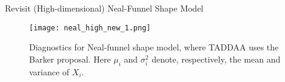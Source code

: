 \documentclass[10pt,xcolor=table]{beamer}
\begin{document}
%


\begin{frame}{Revisit (High-dimensional) Neal-Funnel Shape Model}
\begin{figure}[t]
    \texttt{[image: neal\_high\_new\_1.png]}
    \caption{Diagnostics for Neal-funnel shape model, where 
        TADDAA uses the Barker proposal. 
        Here $\mu_{i}$ and $\sigma_{i}^{2}$ denote, respectively, the mean and variance of $X_{i}$. }
    \label{fig:High Dimensional Neal Funnel Diagnostics}
\end{figure}
\end{frame}
\end{document}
